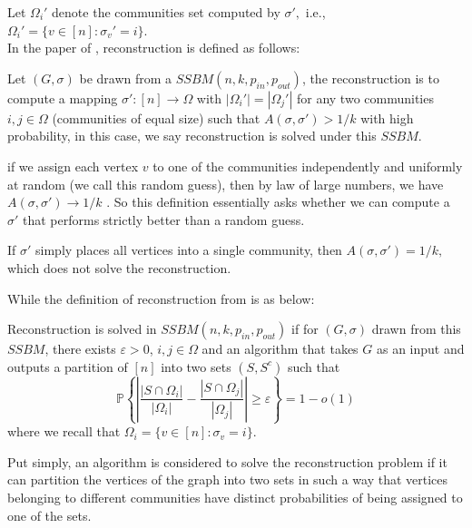 Let $\Omega_i'$ denote the communities set computed by $\sigma',$ i.e., $\Omega_i'=\{v\in[n]: \sigma_v'=i\}.$\\
In the paper of \cite{TheSurvey} \cite{firstpaper}, reconstruction is defined as follows:
\begin{definition}\label{def: recover_1}
Let $(G, \sigma)$ be drawn from a $SSBM(n, k, p_{in}, p_{out})$, the reconstruction is to compute a mapping $\sigma': [n]\rightarrow \Omega$ with $|\Omega_i'|=|\Omega_j'|$ for any two communities $i, j\in\Omega$ (communities of equal size) such that $A(\sigma, \sigma')> 1/k$ with high probability, in this case, we say reconstruction is solved under this $SSBM$.
\end{definition}
\begin{remark}
    if we assign each vertex $v$ to one of the communities independently and uniformly at random (we call this random guess), then by law of large numbers, we have $A(\sigma, \sigma')\rightarrow 1/k$ \cite{TheSurvey}. So this definition essentially asks whether we can compute a $\sigma'$ that performs strictly better than a random guess.
\end{remark}
\begin{remark}
    If $\sigma'$ simply places all vertices into a single community, then $A(\sigma, \sigma')=1/k,$ which does not solve the reconstruction.
\end{remark}
While the definition of reconstruction from \cite{TheConjecture} is as below:
\begin{definition}\label{def: recover_2}
Reconstruction is solved in $SSBM(n, k, p_{in}, p_{out})$ if for $(G,\sigma)$ drawn from this $SSBM$, there exists $\varepsilon > 0$, $i,j \in\Omega$ and an algorithm that takes $G$ as an input and outputs a partition of $[n]$ into two sets $(S,S^c)$ such that\begin{equation}\label{equn:1.4}
    \mathbb{P}\left\{ \left| \frac{|S \cap \Omega_i|}{|\Omega_i|} - \frac{|S \cap \Omega_j|}{|\Omega_j|} \right| \geq \varepsilon \right\} = 1 - o(1)
\end{equation}
where we recall that $\Omega_i = \{ v\in [n] : \sigma_v = i \}.$
\end{definition}
\begin{remark}
    Put simply, an algorithm is considered to solve the reconstruction problem if it can partition the vertices of the graph into two sets in such a way that vertices belonging to different communities have distinct probabilities of being assigned to one of the sets. 
\end{remark}
